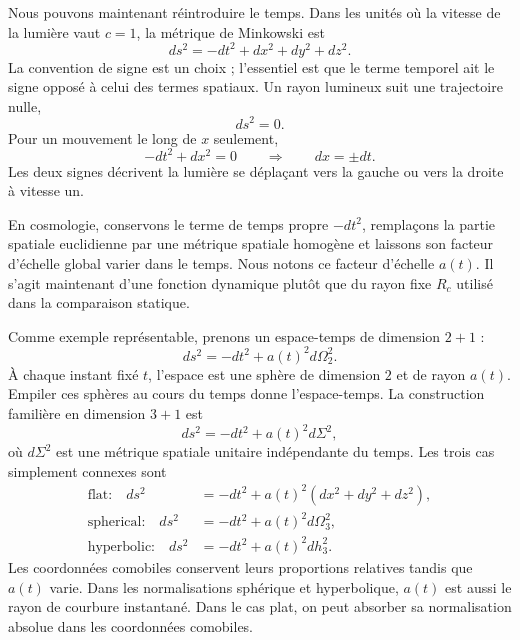 Nous pouvons maintenant réintroduire le temps. Dans les unités où la vitesse de la lumière vaut \(c=1\), la métrique de Minkowski est
\begin{equation}
ds^2 = -dt^2 + dx^2 + dy^2 + dz^2.
\label{eq:c03-minkowski}
\end{equation}
La convention de signe est un choix ; l’essentiel est que le terme temporel ait le signe opposé à celui des termes spatiaux. Un rayon lumineux suit une trajectoire nulle,
\begin{equation}
ds^2 = 0.
\end{equation}
Pour un mouvement le long de \(x\) seulement,
\begin{equation}
-dt^2 + dx^2 = 0
\qquad\Rightarrow\qquad
dx = \pm dt.
\label{eq:c03-null-flat}
\end{equation}
Les deux signes décrivent la lumière se déplaçant vers la gauche ou vers la droite à vitesse un.

En cosmologie, conservons le terme de temps propre \(-dt^2\), remplaçons la partie spatiale euclidienne par une métrique spatiale homogène et laissons son facteur d’échelle global varier dans le temps. Nous notons ce facteur d’échelle \(a(t)\). Il s’agit maintenant d’une fonction dynamique plutôt que du rayon fixe \(R_c\) utilisé dans la comparaison statique.

Comme exemple représentable, prenons un espace-temps de dimension \(2+1\) :
\begin{equation}
ds^2 = -dt^2 + a(t)^2 d\Omega_2^2.
\label{eq:c03-two-plus-one}
\end{equation}
À chaque instant fixé \(t\), l’espace est une sphère de dimension \(2\) et de rayon \(a(t)\). Empiler ces sphères au cours du temps donne l’espace-temps. La construction familière en dimension \(3+1\) est
\begin{equation}
ds^2 = -dt^2 + a(t)^2 d\Sigma^2,
\label{eq:c03-frw-general}
\end{equation}
où \(d\Sigma^2\) est une métrique spatiale unitaire indépendante du temps. Les trois cas simplement connexes sont
\begin{align}
\text{flat:}\quad
ds^2&=-dt^2+a(t)^2\left(dx^2+dy^2+dz^2\right),\label{eq:c03-frw-flat}\\
\text{spherical:}\quad
ds^2&=-dt^2+a(t)^2d\Omega_3^2,\label{eq:c03-frw-spherical}\\
\text{hyperbolic:}\quad
ds^2&=-dt^2+a(t)^2dh_3^2.\label{eq:c03-frw-hyperbolic}
\end{align}
Les coordonnées comobiles conservent leurs proportions relatives tandis que \(a(t)\) varie. Dans les normalisations sphérique et hyperbolique, \(a(t)\) est aussi le rayon de courbure instantané. Dans le cas plat, on peut absorber sa normalisation absolue dans les coordonnées comobiles.

